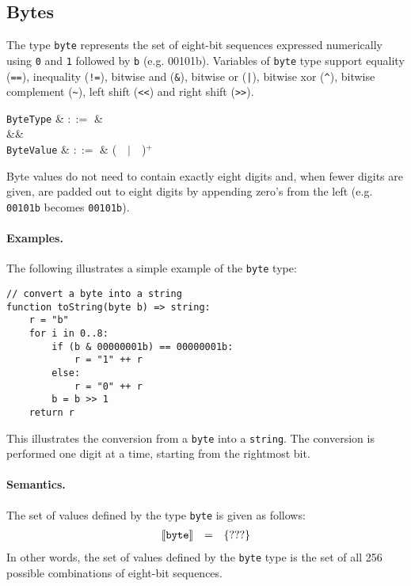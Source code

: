 
\subsection{Bytes}

The type \lstinline{byte} represents the set of eight-bit sequences expressed numerically using \lstinline{0} and \lstinline{1} followed by \lstinline{b} (e.g. 00101b).  Variables of \lstinline{byte} type support equality (\lstinline{==}), inequality (\lstinline{!=}), bitwise and (\lstinline{&}), bitwise or (\lstinline{|}), bitwise xor (\lstinline{^}), bitwise complement (\lstinline{~}), left shift (\lstinline{<<}) and right shift (\lstinline{>>}).

\begin{syntax}
 \verb+ByteType+ & $::=$ & \\
 &&\\
 \verb+ByteValue+ & $::=$ & \big(\ \ $|$\ \ \big)$^+$\ \\
\end{syntax}

Byte values do not need to contain exactly eight digits and, when fewer digits are given, are padded out to eight digits by appending zero's from the left (e.g. \lstinline{00101b} becomes \lstinline{00101b}).

\paragraph{Examples.}  The following illustrates a simple example of the \lstinline{byte} type:

\begin{lstlisting}
// convert a byte into a string
function toString(byte b) => string:
    r = "b"
    for i in 0..8:
        if (b & 00000001b) == 00000001b:
            r = "1" ++ r
        else:
            r = "0" ++ r
        b = b >> 1	
    return r
\end{lstlisting}
This illustrates the conversion from a \lstinline{byte} into a \lstinline{string}.  The conversion is performed one digit at a time, starting from the rightmost bit.

\paragraph{Semantics.}  The set of values defined by the type \lstinline{byte} is given as follows:
\begin{displaymath}
\begin{array}{rcl}
\llbracket{\tt byte}\rrbracket & = & \{???\}\\
\end{array}
\end{displaymath}
In other words, the set of values defined by the \lstinline{byte} type is the set of all 256 possible combinations of eight-bit sequences.


